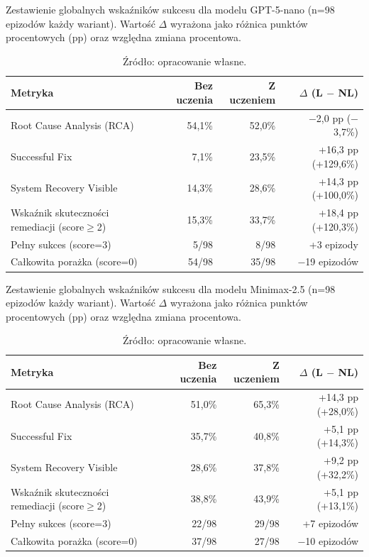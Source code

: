 \begin{table}[H]
    \centering
    \caption{Zestawienie globalnych wskaźników sukcesu dla modelu GPT-5-nano (n=98 epizodów każdy wariant). Wartość $\Delta$ wyrażona jako różnica punktów procentowych (pp) oraz względna zmiana procentowa.}
    \label{tab:overall-success-gpt5}
    \footnotesize
    \begin{tabular}{lrrr}
        \hline
        \textbf{Metryka} & \textbf{Bez uczenia} & \textbf{Z uczeniem} & \textbf{$\Delta$ (L $-$ NL)} \\
        \hline
        Root Cause Analysis (RCA)     & 54,1\%           & 52,0\%           & $-$2,0 pp ($-$3,7\%) \\
        Successful Fix               & 7,1\%            & 23,5\%           & +16,3 pp (+129,6\%) \\
        System Recovery Visible      & 14,3\%           & 28,6\%           & +14,3 pp (+100,0\%) \\
        Wskaźnik skuteczności remediacji (score$\geq$2) & 15,3\%       & 33,7\%           & +18,4 pp (+120,3\%) \\
        Pełny sukces (score=3)        & 5/98             & 8/98             & +3 epizody \\
        Całkowita porażka (score=0)   & 54/98            & 35/98            & $-$19 epizodów \\
        \hline
    \end{tabular}
    \caption*{\footnotesize Źródło: opracowanie własne.}
\end{table}

\begin{table}[H]
    \centering
    \caption{Zestawienie globalnych wskaźników sukcesu dla modelu Minimax-2.5 (n=98 epizodów każdy wariant). Wartość $\Delta$ wyrażona jako różnica punktów procentowych (pp) oraz względna zmiana procentowa.}
    \label{tab:overall-success-minimax}
    \footnotesize
    \begin{tabular}{lrrr}
        \hline
        \textbf{Metryka} & \textbf{Bez uczenia} & \textbf{Z uczeniem} & \textbf{$\Delta$ (L $-$ NL)} \\
        \hline
        Root Cause Analysis (RCA)     & 51,0\%           & 65,3\%           & +14,3 pp (+28,0\%) \\
        Successful Fix               & 35,7\%           & 40,8\%           & +5,1 pp (+14,3\%) \\
        System Recovery Visible      & 28,6\%           & 37,8\%           & +9,2 pp (+32,2\%) \\
        Wskaźnik skuteczności remediacji (score$\geq$2) & 38,8\%       & 43,9\%           & +5,1 pp (+13,1\%) \\
        Pełny sukces (score=3)        & 22/98            & 29/98            & +7 epizodów \\
        Całkowita porażka (score=0)   & 37/98            & 27/98            & $-$10 epizodów \\
        \hline
    \end{tabular}
    \caption*{\footnotesize Źródło: opracowanie własne.}
\end{table}

